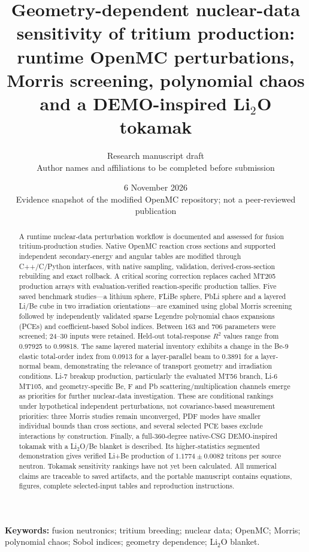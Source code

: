 \documentclass[11pt,a4paper]{article}
\title{Geometry-dependent nuclear-data sensitivity of tritium production:\\runtime OpenMC perturbations, Morris screening, polynomial chaos and a DEMO-inspired Li$_2$O tokamak}
\author{Research manuscript draft\\\small Author names and affiliations to be completed before submission}
\date{6 November 2026\\\small Evidence snapshot of the modified OpenMC repository; not a peer-reviewed publication}
\begin{document}
\maketitle
\begin{abstract}
A runtime nuclear-data perturbation workflow is documented and assessed for fusion tritium-production studies. Native OpenMC reaction cross sections and supported independent secondary-energy and angular tables are modified through C++/C/Python interfaces, with native sampling, validation, derived-cross-section rebuilding and exact rollback. A critical scoring correction replaces cached MT205 production arrays with evaluation-verified reaction-specific production tallies. Five saved benchmark studies---a lithium sphere, FLiBe sphere, PbLi sphere and a layered Li/Be cube in two irradiation orientations---are examined using global Morris screening followed by independently validated sparse Legendre polynomial chaos expansions (PCEs) and coefficient-based Sobol indices. Between 163 and 706 parameters were screened; 24--30 inputs were retained. Held-out total-response $R^2$ values range from 0.97925 to 0.99818. The same layered material inventory exhibits a change in the Be-9 elastic total-order index from 0.0913 for a layer-parallel beam to 0.3891 for a layer-normal beam, demonstrating the relevance of transport geometry and irradiation conditions. Li-7 breakup production, particularly the evaluated MT56 branch, Li-6 MT105, and geometry-specific Be, F and Pb scattering/multiplication channels emerge as priorities for further nuclear-data investigation. These are conditional rankings under hypothetical independent perturbations, not covariance-based measurement priorities: three Morris studies remain unconverged, PDF modes have smaller individual bounds than cross sections, and several selected PCE bases exclude interactions by construction. Finally, a full-360-degree native-CSG DEMO-inspired tokamak with a Li$_2$O/Be blanket is described. Its higher-statistics segmented demonstration gives verified Li+Be production of $1.1774\pm0.0082$ tritons per source neutron. Tokamak sensitivity rankings have not yet been calculated. All numerical claims are traceable to saved artifacts, and the portable manuscript contains equations, figures, complete selected-input tables and reproduction instructions.
\end{abstract}
\textbf{Keywords:} fusion neutronics; tritium breeding; nuclear data; OpenMC; Morris; polynomial chaos; Sobol indices; geometry dependence; Li$_2$O blanket.
\clearpage
\tableofcontents
\clearpage





\FloatBarrier

\FloatBarrier

\FloatBarrier

\FloatBarrier


\clearpage
\appendix

\end{document}
